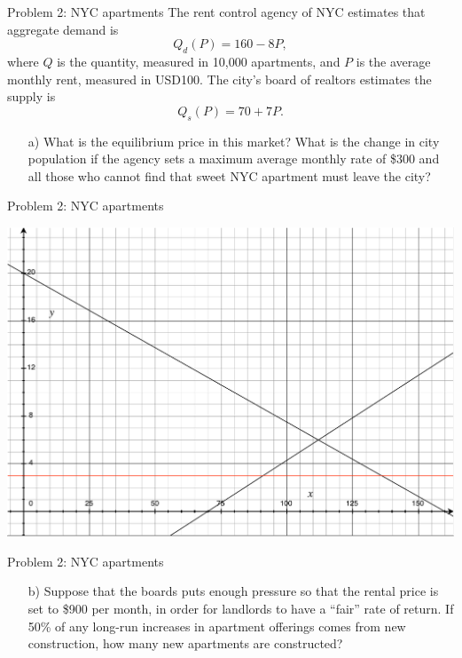 \documentclass[10pt]{beamer}
\begin{document}
\begin{frame}[t]{Problem 2: NYC apartments}
    The rent control agency of NYC estimates that aggregate demand is
    \begin{equation*}
        Q_d(P) = 160 - 8P,
    \end{equation*}
    where \(Q\) is the quantity, measured in 10,000 apartments, and \(P\) is the average monthly rent, measured in USD100.
    The city's board of realtors estimates the supply is
    \begin{equation*}
        Q_s(P) = 70 + 7P.
    \end{equation*}
    \begin{enumerate}
        \item[a)] What is the equilibrium price in this market? What is the change in city population if the agency sets a maximum average monthly rate of \$300 and all those who cannot find that sweet NYC apartment must leave the city?
    \end{enumerate}
\end{frame}

\begin{frame}{Problem 2: NYC apartments}
    \begin{center}
        \includegraphics[width=.95\textwidth]{prob2.pdf}
    \end{center}
\end{frame}

\begin{frame}[t]{Problem 2: NYC apartments}
    \begin{enumerate}
        \item[b)] Suppose that the boards puts enough pressure so that the rental price is set to \$900 per month, in order for landlords to have a ``fair'' rate of return.
        If 50\% of any long-run increases in apartment offerings comes from new construction, how many new apartments are constructed? 
    \end{enumerate}
\end{frame}
\end{document}
